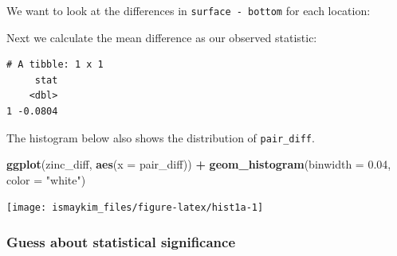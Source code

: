 \documentclass[12pt,]{krantz}
\makeatletter
\newenvironment{Shaded}{\begin{snugshade}}{\end{snugshade}}
\newcommand{\KeywordTok}[1]{\textcolor[rgb]{0.27,0.27,0.27}{\textbf{#1}}}
\newcommand{\DataTypeTok}[1]{\textcolor[rgb]{0.27,0.27,0.27}{#1}}
\newcommand{\FloatTok}[1]{\textcolor[rgb]{0.06,0.06,0.06}{#1}}
\newcommand{\StringTok}[1]{\textcolor[rgb]{0.5,0.5,0.5}{#1}}
\newcommand{\OperatorTok}[1]{\textcolor[rgb]{0.43,0.43,0.43}{\textbf{#1}}}
\newcommand{\NormalTok}[1]{#1}
\newenvironment{kframe}{%
\medskip{}
\setlength{\fboxsep}{.8em}
 \def\at@end@of@kframe{}%
 \ifinner\ifhmode%
  \def\at@end@of@kframe{\end{minipage}}%
  \begin{minipage}{\columnwidth}%
 \fi\fi%
 \def\FrameCommand##1{\hskip\@totalleftmargin \hskip-\fboxsep
 \colorbox{shadecolor}{##1}\hskip-\fboxsep
     \hskip-\linewidth \hskip-\@totalleftmargin \hskip\columnwidth}%
 \MakeFramed {\advance\hsize-\width
   \@totalleftmargin\z@ \linewidth\hsize
   \@setminipage}}%
 {\par\unskip\endMakeFramed%
 \at@end@of@kframe}
\renewenvironment{Shaded}{\begin{kframe}}{\end{kframe}}
\makeatother
\begin{document}
We want to look at the differences in \texttt{surface\ -\ bottom} for
each location:

\begin{Shaded}
\end{Shaded}

Next we calculate the mean difference as our observed statistic:

\begin{Shaded}
\end{Shaded}

\begin{verbatim}
# A tibble: 1 x 1
     stat
    <dbl>
1 -0.0804
\end{verbatim}

The histogram below also shows the distribution of \texttt{pair\_diff}.

\begin{Shaded}
\begin{Highlighting}[]
\KeywordTok{ggplot}\NormalTok{(zinc_diff, }\KeywordTok{aes}\NormalTok{(}\DataTypeTok{x =}\NormalTok{ pair_diff)) }\OperatorTok{+}
\StringTok{  }\KeywordTok{geom_histogram}\NormalTok{(}\DataTypeTok{binwidth =} \FloatTok{0.04}\NormalTok{, }\DataTypeTok{color =} \StringTok{"white"}\NormalTok{)}
\end{Highlighting}
\end{Shaded}

\begin{center}\texttt{[image: ismaykim\_files/figure-latex/hist1a-1]} \end{center}

\subsubsection*{Guess about statistical
significance}\label{guess-about-statistical-significance-4}
\end{document}
